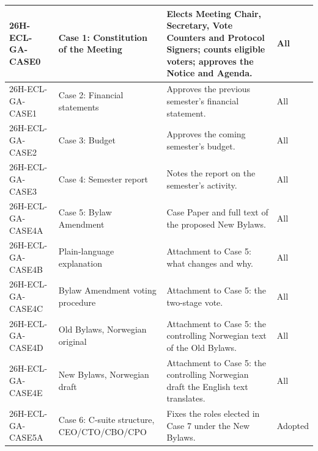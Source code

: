 \documentclass{../../../Common/Latex/Templates/rapport}
\begin{document}
\begin{longtable}{|L{3.2cm}|L{3.6cm}|L{5.3cm}|L{1.9cm}|}
  \hline
  26H-ECL-GA-CASE0     & Case 1: Constitution of the Meeting        & Elects Meeting Chair, Secretary, Vote Counters and Protocol Signers; counts eligible voters; approves the Notice and Agenda. & All           \\
  \hline
  26H-ECL-GA-CASE1     & Case 2: Financial statements               & Approves the previous semester's financial statement.                                                                        & All           \\
  \hline
  26H-ECL-GA-CASE2     & Case 3: Budget                             & Approves the coming semester's budget.                                                                                       & All           \\
  \hline
  26H-ECL-GA-CASE3     & Case 4: Semester report                    & Notes the report on the semester's activity.                                                                                 & All           \\
  \hline
  26H-ECL-GA-CASE4A    & Case 5: Bylaw Amendment                    & Case Paper and full text of the proposed New Bylaws.                                                                         & All           \\
  \hline
  26H-ECL-GA-CASE4B    & Plain-language explanation                 & Attachment to Case 5: what changes and why.                                                                                  & All           \\
  \hline
  26H-ECL-GA-CASE4C    & Bylaw Amendment voting procedure           & Attachment to Case 5: the two-stage vote.                                                                                    & All           \\
  \hline
  26H-ECL-GA-CASE4D    & Old Bylaws, Norwegian original             & Attachment to Case 5: the controlling Norwegian text of the Old Bylaws.                                                      & All           \\
  \hline
  26H-ECL-GA-CASE4E    & New Bylaws, Norwegian draft                & Attachment to Case 5: the controlling Norwegian draft the English text translates.                                           & All           \\
  \hline
  26H-ECL-GA-CASE5A    & Case 6: C-suite structure, CEO/CTO/CBO/CPO & Fixes the roles elected in Case 7 under the New Bylaws.                                                                      & Adopted       \\

\end{longtable}
\end{document}
